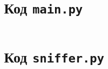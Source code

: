 \documentclass[bachelor, och, coursework]{SCWorks}
\begin{document}




% 
% 

\appendix

    \section{Код \texttt{main.py}}
    \inputminted{python3}{code/sniffer/main.py}

    \section{Код \texttt{sniffer.py}}
    \inputminted{python3}{code/sniffer/sniffer.py}
\end{document}
